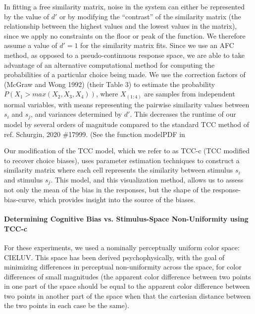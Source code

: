 In fitting a free similarity matrix, noise in the system can either be represented by the value of $d'$ or by modifying the “contrast” of the similarity matrix (the relationship between the highest values and the lowest values in the matrix), since we apply no constraints on the floor or peak of the function. We therefore assume a value of $d'=1$ for the similarity matrix fits.
Since we use an AFC method, as opposed to a pseudo-continuous response space, we are able to take advantage of an alternative computational method for computing the probabilities of a particular choice being made. We use the correction factors of (McGraw and Wong 1992) (their Table 3) to estimate the probability $P(X_1>max(X_2,X_3,X_4 ))$, where $X_(1:4)$ are samples from independent normal variables, with means representing the pairwise similarity values between $s_i$ and $s_j$, and variances determined by $d'$. This decreases the runtime of our model by several orders of magnitude compared to the standard TCC method of ref. {Schurgin, 2020 \#17999}.  (See the function modelPDF in %

Our modification of the TCC model, which we refer to as TCC-c (TCC modified to recover choice biases), uses parameter estimation techniques to construct a similarity matrix where each cell represents the similarity between stimulus $s_i$ and stimulus $s_j$. This model, and this visualization method, allows us to assess not only the mean of the bias in the responses, but the shape of the response-bias-curve, which provides insight into the source of the biases.


\paragraph{Determining Cognitive Bias vs. Stimulus-Space Non-Uniformity using TCC-c}

For these experiments, we used a nominally perceptually uniform color space: CIELUV. This space has been derived psychophysically, with the goal of minimizing differences in perceptual non-uniformity across the space, for color differences of small magnitudes (the apparent color difference between two points in one part of the space should be equal to the apparent color difference between two points in another part of the space when that the cartesian distance between the two points in each case be the same).

